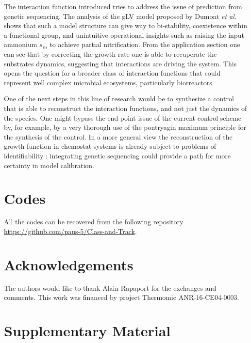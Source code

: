 \documentclass[3p,times]{article}
\begin{document}
The interaction function introduced tries to address the issue of prediction from genetic sequencing. The analysis of the gLV model proposed by Dumont \textit{et al.} \cite{Dumont2016} shows that such a model structure can give way to bi-stability, coexistence within a functional group, and unintuitive operational insights such as raising the input ammonium $s_{in}$ to achieve partial nitrification. From the application section one can see that by correcting the growth rate one is able to recuperate the substrates dynamics, suggesting that interactions are driving the system. This opens the question for a broader class of interaction functions that could represent well complex microbial ecosystems, particularly biorreactors. 

One of the next steps in this line of research would be to synthesize a control that is able to reconstruct the interaction functions, and not just the dynamics of the species. One might bypass the end point issue of the current control scheme by, for example, by a very thorough use of the pontryagin maximum principle for the synthesis of the control. In a more general view the reconstruction of the growth function in chemostat systems is already subject to problems of identifiability \cite{Dochain2003}: integrating genetic sequencing could provide a path for more certainty in model calibration.


\section{Codes}

All the codes can be recovered from the following repository \url{https://github.com/paus-5/Class-and-Track}.
\section{Acknowledgements}
 The authors would like to thank Alain Rapaport for the exchanges and comments. This work was financed by project Thermomic ANR-16-CE04-0003.

\section{Supplementary Material}
\end{document}
